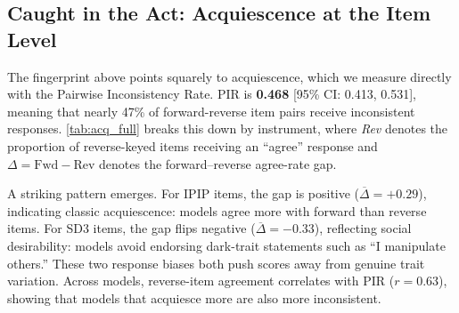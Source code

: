 \documentclass[11pt]{article}
\begin{document}
\subsection{Caught in the Act: Acquiescence at the Item Level}

The fingerprint above points squarely to acquiescence, which we measure directly with the Pairwise Inconsistency Rate. PIR is \textbf{0.468} [95\% CI: 0.413, 0.531], meaning that nearly 47\% of forward-reverse item pairs receive inconsistent responses. \cref{tab:acq_full} breaks this down by instrument, where \emph{Rev} denotes the proportion of reverse-keyed items receiving an ``agree'' response and $\Delta = \text{Fwd} - \text{Rev}$ denotes the forward--reverse agree-rate gap.

A striking pattern emerges. For IPIP items, the gap is positive ($\overline{\Delta} = +0.29$), indicating classic acquiescence: models agree more with forward than reverse items. For SD3 items, the gap flips negative ($\overline{\Delta} = -0.33$), reflecting social desirability: models avoid endorsing dark-trait statements such as ``I manipulate others.'' These two response biases both push scores away from genuine trait variation. Across models, reverse-item agreement correlates with PIR ($r = 0.63$), showing that models that acquiesce more are also more inconsistent.
\end{document}

